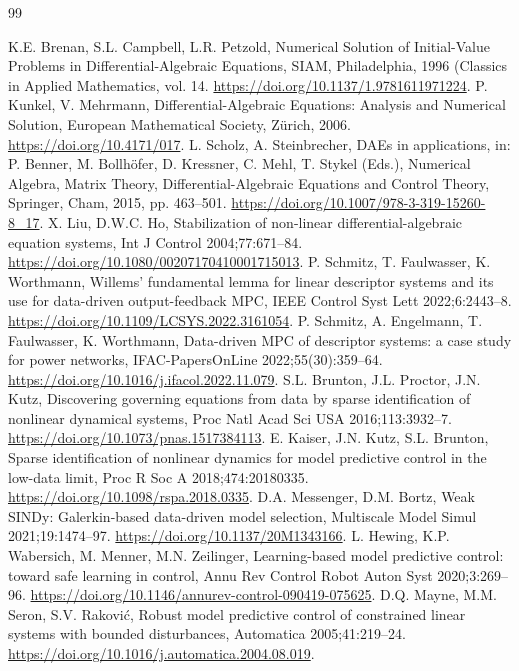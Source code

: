 \documentclass[preprint,12pt]{elsarticle}
\begin{document}
\begin{thebibliography}{99}
\raggedright
{} K.E. Brenan, S.L. Campbell, L.R. Petzold, Numerical Solution of Initial-Value Problems in Differential-Algebraic Equations, SIAM, Philadelphia, 1996 (Classics in Applied Mathematics, vol. 14. \url{https://doi.org/10.1137/1.9781611971224}.
 P. Kunkel, V. Mehrmann, Differential-Algebraic Equations: Analysis and Numerical Solution, European Mathematical Society, Z{\"u}rich, 2006. \url{https://doi.org/10.4171/017}.
 L. Scholz, A. Steinbrecher, DAEs in applications, in: P. Benner, M. Bollh{\"o}fer, D. Kressner, C. Mehl, T. Stykel (Eds.), Numerical Algebra, Matrix Theory, Differential-Algebraic Equations and Control Theory, Springer, Cham, 2015, pp. 463--501. \url{https://doi.org/10.1007/978-3-319-15260-8_17}.
 X. Liu, D.W.C. Ho, Stabilization of non-linear differential-algebraic equation systems, Int J Control 2004;77:671--84. \url{https://doi.org/10.1080/00207170410001715013}.
 P. Schmitz, T. Faulwasser, K. Worthmann, Willems' fundamental lemma for linear descriptor systems and its use for data-driven output-feedback MPC, IEEE Control Syst Lett 2022;6:2443--8. \url{https://doi.org/10.1109/LCSYS.2022.3161054}.
 P. Schmitz, A. Engelmann, T. Faulwasser, K. Worthmann, Data-driven MPC of descriptor systems: a case study for power networks, IFAC-PapersOnLine 2022;55(30):359--64. \url{https://doi.org/10.1016/j.ifacol.2022.11.079}.
 S.L. Brunton, J.L. Proctor, J.N. Kutz, Discovering governing equations from data by sparse identification of nonlinear dynamical systems, Proc Natl Acad Sci USA 2016;113:3932--7. \url{https://doi.org/10.1073/pnas.1517384113}.
 E. Kaiser, J.N. Kutz, S.L. Brunton, Sparse identification of nonlinear dynamics for model predictive control in the low-data limit, Proc R Soc A 2018;474:20180335. \url{https://doi.org/10.1098/rspa.2018.0335}.
 D.A. Messenger, D.M. Bortz, Weak SINDy: Galerkin-based data-driven model selection, Multiscale Model Simul 2021;19:1474--97. \url{https://doi.org/10.1137/20M1343166}.
 L. Hewing, K.P. Wabersich, M. Menner, M.N. Zeilinger, Learning-based model predictive control: toward safe learning in control, Annu Rev Control Robot Auton Syst 2020;3:269--96. \url{https://doi.org/10.1146/annurev-control-090419-075625}.
 D.Q. Mayne, M.M. Seron, S.V. Rakovi{\'c}, Robust model predictive control of constrained linear systems with bounded disturbances, Automatica 2005;41:219--24. \url{https://doi.org/10.1016/j.automatica.2004.08.019}.

\end{thebibliography}
\end{document}
